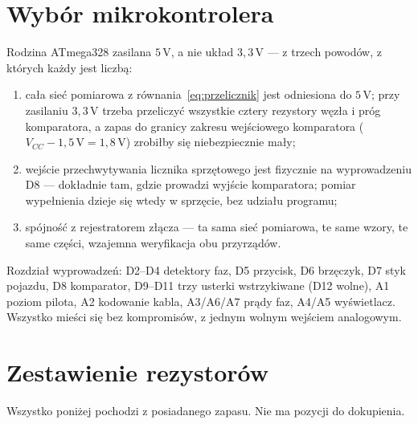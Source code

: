 \documentclass[a4paper,11pt]{article}
\newcommand{\volt}{\,\mathrm{V}}
\begin{document}
\section{Wybór mikrokontrolera}

Rodzina ATmega328 zasilana $5\volt$, a nie układ $3{,}3\volt$ --- z trzech powodów,
z których każdy jest liczbą:

\begin{enumerate}
\item cała sieć pomiarowa z równania~\eqref{eq:przelicznik} jest odniesiona do
      $5\volt$; przy zasilaniu $3{,}3\volt$ trzeba przeliczyć wszystkie cztery
      rezystory węzła i próg komparatora, a zapas do granicy zakresu wejściowego
      komparatora ($V_{CC}-1{,}5\volt = 1{,}8\volt$) zrobiłby się niebezpiecznie
      mały;
\item wejście przechwytywania licznika sprzętowego jest fizycznie na wyprowadzeniu
      D8 --- dokładnie tam, gdzie prowadzi wyjście komparatora; pomiar wypełnienia
      dzieje się wtedy w sprzęcie, bez udziału programu;
\item spójność z rejestratorem złącza --- ta sama sieć pomiarowa, te same wzory,
      te same części, wzajemna weryfikacja obu przyrządów.
\end{enumerate}

Rozdział wyprowadzeń: D2--D4 detektory faz, D5 przycisk, D6 brzęczyk, D7 styk
pojazdu, D8 komparator, D9--D11 trzy usterki wstrzykiwane (D12 wolne),
A1 poziom pilota, A2 kodowanie kabla, A3/A6/A7 prądy faz, A4/A5 wyświetlacz.
Wszystko mieści się bez kompromisów, z jednym wolnym wejściem analogowym.

\section{Zestawienie rezystorów}
\label{sec:zestawienie}

Wszystko poniżej pochodzi z posiadanego zapasu. Nie ma pozycji do dokupienia.
\end{document}
